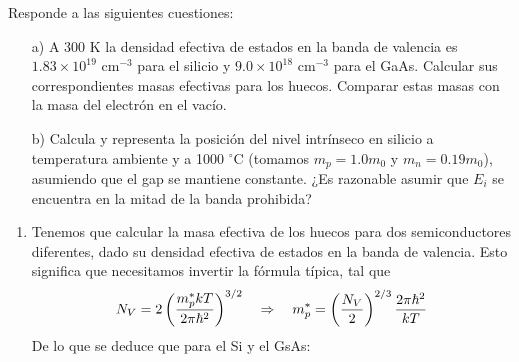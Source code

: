 


\begin{texercise}
	Responde a las siguientes cuestiones:
	\begin{enumerate}
		\item[a)] A 300 K la densidad efectiva de estados en la banda de valencia es $1.83 \times 10^{19} \text{ cm}^{-3}$ para el silicio y $9.0 \times 10^{18} \text{ cm}^{-3}$ para el GaAs. Calcular sus correspondientes masas efectivas para los huecos. Comparar estas masas con la masa del electrón en el vacío.

		\item[b)] Calcula y representa la posición del nivel intrínseco en silicio a temperatura ambiente y a 1000 $^{\circ}$C (tomamos $m_p = 1.0m_0$ y $m_n = 0.19m_0$), asumiendo que el gap se mantiene constante. ¿Es razonable asumir que $E_i$ se encuentra en la mitad de la banda prohibida?
	\end{enumerate}
	\tcblower
	\begin{enumerate}[label=\alph*)]
		\item	Tenemos que calcular la masa efectiva de los huecos para dos semiconductores diferentes, dado su densidad efectiva de estados en la banda de valencia. Esto significa que necesitamos invertir la fórmula típica, tal que
		      \begin{equation}
			      N_V = 2 \left( \frac{m_p^* kT}{2\pi\hbar^2} \right)^{3/2} \quad \Rightarrow \quad m_p^* = \left( \frac{N_V}{2} \right)^{2/3} {\frac{2 \pi \hbar^2}{kT}}
		      \end{equation}
		      De lo que se deduce que para el Si y el GsAs:


\end{enumerate}
\end{texercise}
